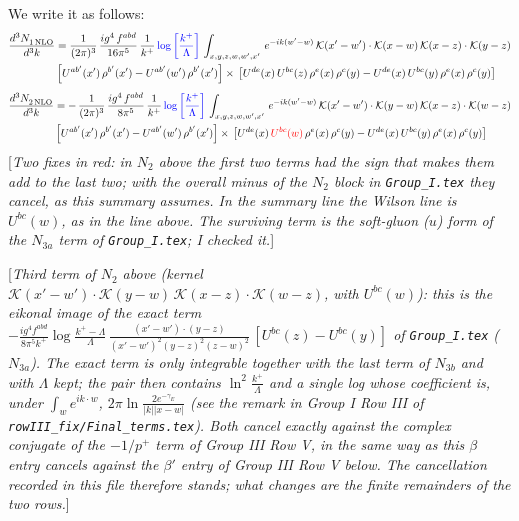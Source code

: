 \documentclass[9pt]{article}
\newcommand{\chg}[1]{{\color{red}#1}}
\newcommand{\rnote}[1]{{\color{teal}[\textit{#1}]}}
\numberwithin{equation}{section}
\begin{document}
We write it as follows: 
\begin{align}
   \frac{d^{3}N_{1\,\rm NLO}^{\rm}}{d^{3}k}  & = \frac{1}{(2\pi)^{3}}\,\frac{ig^{4}\,f^{abd}}{16\pi^{5}}\,\frac{1}{k^{+}}\,{\color{blue}\log{\left[\frac{k^{+}}{\Lambda}\right]}}\,\int_{x,y,z,w,w',x'}\,e^{-ik(w^\prime-w)}\, \mathcal{K}(x'-w')\cdot \mathcal{K}(x-w)\, \mathcal{K}(x-z)\cdot \mathcal{K}(y-z) \notag \\ & \left[U^{ab'}(x')\,\rho^{b'}(x')-U^{ab'}(w')\, \rho^{b'}(x')\right]\times\, \left[U^{de}(x)\,U^{bc}(z)\, \rho^{e}(x)\,\rho^{c}(y)-U^{de}(x)\,U^{bc}(y)\,\rho^{e}(x)\,\rho^{c}(y)\right]
\end{align}
\begin{align}
   \frac{d^{3}N_{2\,\rm NLO}^{\rm}}{d^{3}k}  & = -\,\frac{1}{(2\pi)^{3}}\, \frac{ig^{4}\, f^{abd}}{8\pi^{5}}\, \frac{1}{k^{+}}\,{\color{blue}\log{\left[\frac{k^{+}}{\Lambda}\right]}}\,\int_{x,y,z,w,w',x'}\,e^{-ik(w^\prime-w)}\, \mathcal{K}(x'-w')\cdot \mathcal{K}(y-w)\,\mathcal{K}(x-z)\cdot \mathcal{K}(w-z) \notag \\ & \left[U^{ab'}(x')\,\rho^{b'}(x')-U^{ab'}(w')\, \rho^{b'}(x')\right]\times\,\left[U^{de}(x)\,\chg{U^{bc}(w)}\, \rho^{e}(x)\,\rho^{c}(y)-U^{de}(x)\,U^{bc}(y)\,\rho^{e}(x)\,\rho^{c}(y)\right] 
\end{align}
\rnote{Two fixes in red: in $N_{2}$ above the first two terms had the sign that makes them add to the last two; with the overall minus of the $N_{2}$ block in \texttt{Group\_I.tex} they cancel, as this summary assumes. In the summary line the Wilson line is $U^{bc}(w)$, as in the line above. The surviving term is the soft-gluon ($u$) form of the $N_{3a}$ term of \texttt{Group\_I.tex}; I checked it.}

\rnote{Third term of $N_{2}$ above (kernel $\mathcal{K}(x'-w')\cdot\mathcal{K}(y-w)\,\mathcal{K}(x-z)\cdot\mathcal{K}(w-z)$, with $U^{bc}(w)$): this is the eikonal image of the exact term $-\frac{ig^{4}f^{abd}}{8\pi^{5}k^{+}}\log\frac{k^{+}-\Lambda}{\Lambda}\,\frac{(x'-w')\cdot(y-z)}{(x'-w')^{2}(y-z)^{2}(z-w)^{2}}\,[U^{bc}(z)-U^{bc}(y)]$ of \texttt{Group\_I.tex} ($N_{3a}$). The exact term is only integrable together with the last term of $N_{3b}$ and with $\Lambda$ kept; the pair then contains $\ln^{2}\frac{k^{+}}{\Lambda}$ and a single log whose coefficient is, under $\int_{w}e^{ik\cdot w}$, $2\pi\ln\frac{2e^{-\gamma_{E}}}{|k||x-w|}$ (see the remark in Group I Row III of \texttt{rowIII\_fix/Final\_terms.tex}). Both cancel exactly against the complex conjugate of the $-1/p^{+}$ term of Group III Row V, in the same way as this $\beta$ entry cancels against the $\beta'$ entry of Group III Row V below. The cancellation recorded in this file therefore stands; what changes are the finite remainders of the two rows.}
\end{document}
